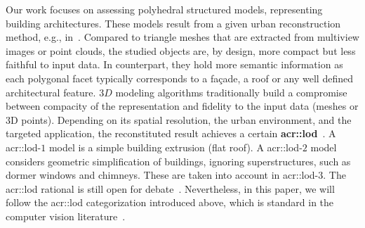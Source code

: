 \documentclass[runningheads]{llncs}
\begin{document}
    Our work focuses on assessing polyhedral structured models, representing building architectures. These models result from a given urban reconstruction method, e.g., in~\cite{dick2004modelling}. Compared to triangle meshes that are extracted from multiview images or point clouds, the studied objects are, by design, more compact but less faithful to input data. In counterpart, they hold more semantic information as each polygonal facet typically corresponds to a fa\c{c}ade, a roof or any well defined architectural feature. $3D$ modeling algorithms traditionally build a compromise between compacity of the representation and fidelity to the input data (meshes or 3D points). Depending on its spatial resolution, the urban environment, and the targeted application, the reconstituted result achieves a certain \textbf{\gls{acr::lod}}~\cite{kolbe2005citygml}. A \acrshort{acr::lod}-$1$ model is a simple building extrusion (flat roof). A \acrshort{acr::lod}-$2$ model considers geometric simplification of buildings, ignoring superstructures, such as dormer windows and chimneys. These are taken into account in \acrshort{acr::lod}-$3$. The \acrshort{acr::lod} rational is still open for debate~\cite{2016_ceus_improved_lod}. Nevertheless, in this paper, we will follow the \acrshort{acr::lod} categorization introduced above, which is standard in the computer vision literature~\cite{verdie2015lod}.
\end{document}
